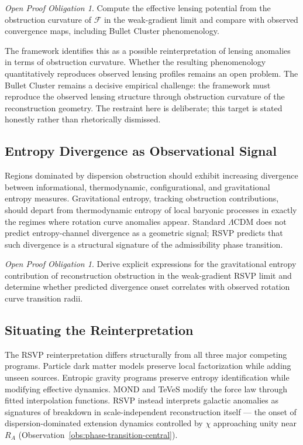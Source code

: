 \documentclass[11pt, a4paper]{article}
\theoremstyle{plain}
\theoremstyle{definition}
\theoremstyle{remark}
\newtheorem{obligation}[theorem]{Open Proof Obligation}
\newcommand{\RA}{R_{\!A}}
\newcommand{\sheaf}{\mathcal{F}}
\begin{document}
\begin{obligation}
\label{obl:lensing}
Compute the effective lensing potential from the obstruction curvature of $\sheaf$
in the weak-gradient limit and compare with observed convergence maps, including
Bullet Cluster phenomenology.
\end{obligation}

The framework identifies this as a possible reinterpretation of lensing anomalies in
terms of obstruction curvature. Whether the resulting phenomenology quantitatively
reproduces observed lensing profiles remains an open problem. The Bullet Cluster
remains a decisive empirical challenge: the framework must reproduce the observed
lensing structure through obstruction curvature of the reconstruction geometry. The
restraint here is deliberate; this target is stated honestly rather than
rhetorically dismissed.

\subsection{Entropy Divergence as Observational Signal}

Regions dominated by dispersion obstruction should exhibit increasing divergence
between informational, thermodynamic, configurational, and gravitational entropy
measures. Gravitational entropy, tracking obstruction contributions, should depart
from thermodynamic entropy of local baryonic processes in exactly the regimes where
rotation curve anomalies appear. Standard $\Lambda$CDM does not predict
entropy-channel divergence as a geometric signal; RSVP predicts that such divergence
is a structural signature of the admissibility phase transition.

\begin{obligation}
\label{obl:entropy-signal}
Derive explicit expressions for the gravitational entropy contribution of
reconstruction obstruction in the weak-gradient RSVP limit and determine whether
predicted divergence onset correlates with observed rotation curve transition radii.
\end{obligation}

\subsection{Situating the Reinterpretation}

The RSVP reinterpretation differs structurally from all three major competing
programs. Particle dark matter models preserve local factorization while adding
unseen sources. Entropic gravity programs \cite{verlinde2017,padmanabhan2010}
preserve entropy identification while modifying effective dynamics. MOND and TeVeS
\cite{milgrom1983,bekenstein2004} modify the force law through fitted interpolation
functions. RSVP instead interprets galactic anomalies as signatures of breakdown in
scale-independent reconstruction itself --- the onset of dispersion-dominated
extension dynamics controlled by $\chi$ approaching unity near $\RA$
(Observation~\ref{obs:phase-transition-central}).
\end{document}
